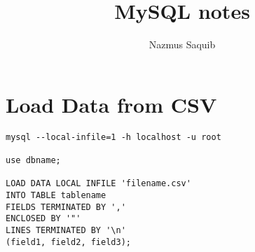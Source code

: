 \documentclass[12pt, a4paper]{article}
\begin{document}
\title{MySQL notes}
\author{Nazmus Saquib}

\maketitle
\tableofcontents

\section{Load Data from CSV}
\begin{verbatim}
mysql --local-infile=1 -h localhost -u root

use dbname;

LOAD DATA LOCAL INFILE 'filename.csv'
INTO TABLE tablename
FIELDS TERMINATED BY ','
ENCLOSED BY '"'
LINES TERMINATED BY '\n'
(field1, field2, field3);
\end{verbatim}
\end{document}
